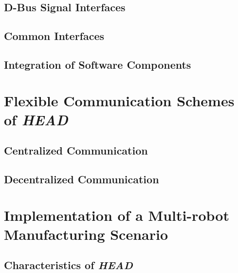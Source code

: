 \documentclass{ifacconf}
\begin{document}
\subsection{D-Bus Signal Interfaces}

\subsection{Common Interfaces}


\subsection{Integration of Software Components}

\section{Flexible Communication  Schemes of {\em HEAD}}
\subsection{Centralized Communication}

\subsection{Decentralized Communication}


\section{Implementation of a Multi-robot Manufacturing Scenario}
\subsection{Characteristics of {\em HEAD}}
\end{document}
